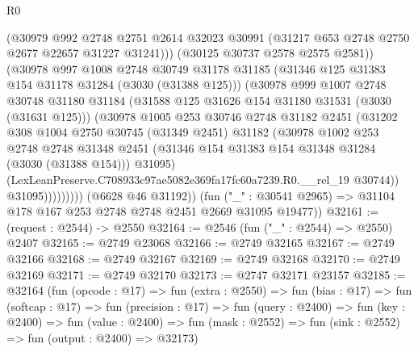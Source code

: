 \begin{lexlean}{R0}
\begin{coremodule}
                        (@30979
                          @992
                          @2748
                          @2751
                          @2614
                          @32023
                          @30991
                          (@31217 @653 @2748 @2750 @2677 @22657 @31227 @31241)))
                      (@30125 @30737 @2578 @2575 @2581))
                    (@30978
                      @997
                      @1008
                      @2748
                      @30749
                      @31178
                      @31185
                      (@31346 @125 @31383 @154 @31178 @31284 (@3030 (@31388 @125)))
                      (@30978
                        @999
                        @1007
                        @2748
                        @30748
                        @31180
                        @31184
                        (@31588 @125 @31626 @154 @31180 @31531 (@3030 (@31631 @125)))
                        (@30978
                          @1005
                          @253
                          @30746
                          @2748
                          @31182
                          @2451
                          (@31202
                            @308
                            @1004
                            @2750
                            @30745
                            (@31349 @2451)
                            @31182
                            (@30978
                              @1002
                              @253
                              @2748
                              @2748
                              @31348
                              @2451
                              (@31346 @154 @31383 @154 @31348 @31284 (@3030 (@31388 @154)))
                              @31095)
                            (LexLeanPreserve.C708933c97ae5082e369fa17fc60a7239.R0.__rel_19 @30744))
                          @31095)))))))))
        (@6628 @46 @31192))
      (fun ("_" : @30541 @2965) => @31104 @178 @167 @253 @2748 @2748 @2451 @2669 @31095 @19477))
@32161 := (request : @2544) -> @2550
@32164 := @2546 (fun ("_" : @2544) => @2550) @2407
@32165 := @2749 @23068
@32166 := @2749 @32165
@32167 := @2749 @32166
@32168 := @2749 @32167
@32169 := @2749 @32168
@32170 := @2749 @32169
@32171 := @2749 @32170
@32173 := @2747 @32171 @23157
@32185 := @32164
    (fun (opcode : @17) =>
    fun (extra : @2550) =>
    fun (bias : @17) =>
    fun (softcap : @17) =>
    fun (precision : @17) =>
    fun (query : @2400) =>
    fun (key : @2400) =>
    fun (value : @2400) =>
    fun (mask : @2552) => fun (sink : @2552) => fun (output : @2400) => @32173)

\end{coremodule}
\end{lexlean}
